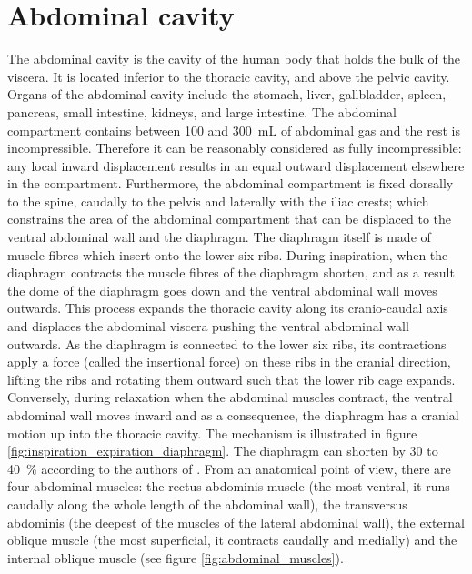 \section{\label{sec:abdominal_cavity}Abdominal cavity}
The abdominal cavity is the cavity of the human body that holds the bulk of the viscera. It is located inferior to the thoracic cavity, and above the pelvic cavity. Organs of the abdominal cavity include the stomach, liver, gallbladder, spleen, pancreas, small intestine, kidneys, and large intestine.
The abdominal compartment contains between 100 and 300~mL of abdominal gas and the rest is incompressible. Therefore it can be reasonably considered as fully incompressible: any local inward displacement results in an equal outward displacement elsewhere in the compartment. Furthermore, the abdominal compartment is fixed dorsally to the spine, caudally to the pelvis and laterally with the iliac crests; which constrains the area of the abdominal compartment that can be displaced to the ventral abdominal wall and the diaphragm. The diaphragm itself is made of muscle fibres which insert onto the lower six ribs. During inspiration, when the diaphragm contracts the muscle fibres of the diaphragm shorten, and as a result the dome of the diaphragm goes down and the ventral abdominal wall moves outwards. This process expands the thoracic cavity along its cranio-caudal axis and displaces the abdominal viscera pushing the ventral abdominal wall outwards. As the diaphragm is connected to the lower six ribs, its contractions apply a force (called the insertional force) on these ribs in the cranial direction, lifting the ribs and rotating them outward such that the lower rib cage expands. Conversely, during relaxation when the abdominal muscles contract, the ventral abdominal wall moves inward and as a consequence, the diaphragm has a cranial motion up into the thoracic cavity. The mechanism is illustrated in figure \ref{fig:inspiration_expiration_diaphragm}. The diaphragm can shorten by 30 to 40~\% according to the authors of \cite{hamid2006phys}. From an anatomical point of view, there are four abdominal muscles: the rectus abdominis muscle (the most ventral, it runs caudally along the whole length of the abdominal wall), the transversus abdominis (the deepest of the muscles of the lateral abdominal wall), the external oblique muscle (the most superficial, it contracts caudally and medially) and the internal oblique muscle (see figure \ref{fig:abdominal_muscles}).

